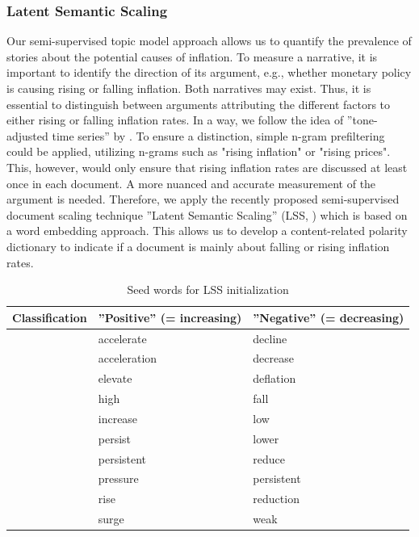 \subsubsection{Latent Semantic Scaling}

Our semi-supervised topic model approach allows us to quantify the prevalence of stories about the potential causes of inflation. To measure a narrative, it is important to identify the direction of its argument, e.g., whether monetary policy is causing rising or falling inflation. Both narratives may exist. Thus, it is essential to distinguish between arguments attributing the different factors to either rising or falling inflation rates. In a way, we follow the idea of ''tone-adjusted time series'' by \citep{Larsen.2019}. To ensure a distinction, simple n-gram prefiltering could be applied, utilizing n-grams such as "rising inflation" or "rising prices". This, however, would only ensure that rising inflation rates are discussed at least once in each document. A more nuanced and accurate measurement of the argument is needed. Therefore, we apply the recently proposed semi-supervised document scaling technique ''Latent Semantic Scaling'' (\textsf{LSS},  \cite{Watanabe.2021}) which is based on a word embedding approach. This allows us to develop a content-related polarity dictionary to indicate if a document is mainly about falling or rising inflation rates. 

\begin{table}[H]
	\centering
	\begin{tabular}{l|l|l}
		\toprule
		Classification 	& ''Positive'' (= increasing) 		& ''Negative'' (= decreasing)\\
		\midrule
						& accelerate 	& decline  \\
						& acceleration  & decrease \\
						& elevate 		& deflation \\
						& high			& fall \\
						& increase		& low \\
						& persist		& lower\\
						& persistent	& reduce\\
						& pressure		& persistent\\
						& rise			& reduction\\
						& surge			& weak\\
		\bottomrule
	\end{tabular}
	\caption{Seed words for LSS initialization}\label{table:seed_words}
\end{table}

